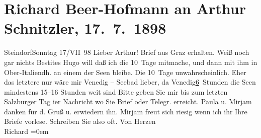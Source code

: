 

         
         \renewcommand{\erwaehntePersonen}{Personen: Richard Beer-Hofmann, Paula Beer-Hofmann, Mirjam Beer-Hofmann, Hugo von Hofmannsthal}
         \renewcommand{\erwaehnteOrte}{Orte: Bad Gastein, Graz, Italien, Salzburg, Steindorf am Ossiacher See, Venedig}
         \renewcommand{\erwaehnteWerke}{}
               \section[Richard Beer-Hofmann an Arthur Schnitzler, 17. 7. 1898]{ Richard Beer-Hofmann an Arthur Schnitzler, 17. 7. 1898}\nopagebreak{}\rehead{ }\begin{ledgroupsized}[t]{13cm}\normalsize\beginnumbering \toendnotes[C]{\smallbreak\pagebreak[2]} 
\pstart
           \raggedleft{}{\pb}SteindorfSonntag 17/VII 98\pend
           \pstart
           Lieber Arthur! Brief aus Graz
               erhalten. Weiß noch gar nichts Besti{\geminationm}tes\pend
           \pstart
           Hugo will daß ich die 10 Tage mitmache, und
               dann mit ihm in Ober-Italiendh. an einem der Seen bleibe. Die
               10 Tage unwahrscheinlich. Eher das letztere nur wäre mir Venedig – Seebad lieber, da Venedig\uline{6} Stunden die Seen mindestens 15–16 {\pb}Stunden weit sind\pend
           \pstart
           Bitte geben Sie mir bis zum letzten Salzburger Tag
                  i{\geminationm}er Nachricht wo Sie Brief oder Telegr.
               erreicht.\pend
           \pstart
           Paula u. Mirjam dan{\pb}ken für d. Gruß
               u. erwiedern ihn. Mirjam freut sich riesig wenn
               ich ihr Ihre Briefe vorlese. Schreiben Sie also oft.\pend
           \pstart
           Von Herzen{\\[\baselineskip]}\spacefill\mbox{Richard}\pend
           \leftskip=0em{}
         
         \endnumbering{}\end{ledgroupsized}  \newcommand{\dateiname}{L00821}\newcommand{\titel}{Richard Beer-Hofmann an Arthur Schnitzler, 17. 7. 1898}\newcommand{\editorInnen}{Martin Anton Müller und Gerd-Hermann Susen}
      